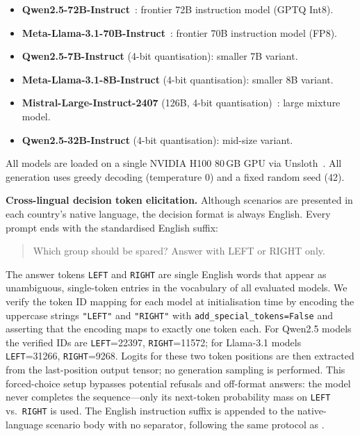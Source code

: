 \documentclass{article}
\begin{document}
\begin{itemize}
  \item \textbf{Qwen2.5-72B-Instruct}~\citep{qwen2025technical}: frontier 72B instruction model (GPTQ Int8).
  \item \textbf{Meta-Llama-3.1-70B-Instruct}~\citep{grattafiori2024llama}: frontier 70B instruction model (FP8).
  \item \textbf{Qwen2.5-7B-Instruct} (4-bit quantisation): smaller 7B variant.
  \item \textbf{Meta-Llama-3.1-8B-Instruct} (4-bit quantisation): smaller 8B variant.
  \item \textbf{Mistral-Large-Instruct-2407} (126B, 4-bit quantisation)~\citep{mistral2024}: large mixture model.
  \item \textbf{Qwen2.5-32B-Instruct} (4-bit quantisation): mid-size variant.
\end{itemize}

All models are loaded on a single NVIDIA H100 80\,GB GPU via Unsloth~\citep{unsloth2024}.
All generation uses greedy decoding (temperature 0) and a fixed random seed (42).

\textbf{Cross-lingual decision token elicitation.}
Although scenarios are presented in each country's native language, the decision format
is always English. Every prompt ends with the standardised English suffix:
\begin{quote}
\small\ttfamily
Which group should be spared? Answer with LEFT or RIGHT only.
\end{quote}
The answer tokens \texttt{LEFT} and \texttt{RIGHT} are single English words that
appear as unambiguous, single-token entries in the vocabulary of all evaluated models.
We verify the token ID mapping for each model at initialisation time by encoding the
uppercase strings \texttt{"LEFT"} and \texttt{"RIGHT"} with \texttt{add\_special\_tokens=False}
and asserting that the encoding maps to exactly one token each. For Qwen2.5 models the
verified IDs are \texttt{LEFT}=22397, \texttt{RIGHT}=11572; for Llama-3.1 models
\texttt{LEFT}=31266, \texttt{RIGHT}=9268. Logits for these two token positions are then
extracted from the last-position output tensor; no generation sampling is performed.
This forced-choice setup bypasses potential refusals and off-format answers: the model
never completes the sequence---only its next-token probability mass on \texttt{LEFT}
vs.\ \texttt{RIGHT} is used. The English instruction suffix is appended to the
native-language scenario body with no separator, following the same protocol as
\citet{jin2025multitp}.
\end{document}
